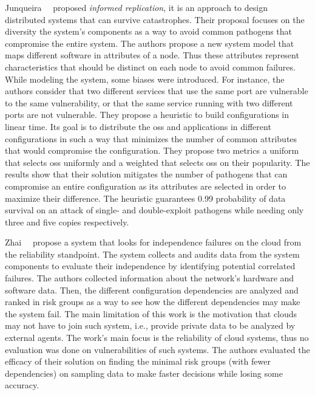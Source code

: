 Junqueira~\etal{}~\cite{Junqueira:2005} proposed \emph{informed replication}, it is an approach to design distributed systems that can survive catastrophes. 
Their proposal focuses on the diversity the system's components as a way to avoid common pathogens that compromise the entire system.
The authors propose a new system model that maps different software in attributes of a node. Thus these attributes represent characteristics that should be distinct on each node to avoid common failures.
While modeling the system, some biases were introduced.
For instance, the authors consider that two different services that use the same port are vulnerable to the same vulnerability, or that the same service running with two different ports are not vulnerable.
They propose a heuristic to build configurations in linear time.
Its goal is to distribute the \glspl{os} and applications in different configurations in such a way that minimizes the number of common attributes that would compromise the configuration.
They propose two metrics a uniform that selects \glspl{os} uniformly and a weighted that selects \glspl{os} on their popularity.
The results show that their solution mitigates the number of pathogens that can compromise an entire configuration as its attributes are selected in order to maximize their difference.
The heuristic guarantees 0.99 probability of data survival on an attack of single- and double-exploit pathogens while needing only three and five copies respectively.


Zhai~\etal{}~\cite{Zhai:2014} propose a system that looks for independence failures on the cloud from the reliability standpoint. 
The system collects and audits data from the system components to evaluate their independence by identifying potential correlated failures.
The authors collected information about the network's hardware and software data.
Then, the different configuration dependencies are analyzed and ranked in risk groups as a way to see how the different dependencies may make the system fail.
The main limitation of this work is the motivation that clouds may not have to join such system, i.e., provide private data to be analyzed by external agents.
The work's main focus is the reliability of cloud systems, thus no evaluation was done on vulnerabilities of such systems.
The authors evaluated the efficacy of their solution on finding the minimal risk groups (with fewer dependencies) on sampling data to make faster decisions while losing some accuracy.


